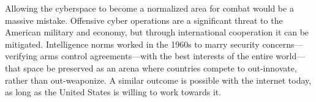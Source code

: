 \documentclass[11pt]{memoir}
\begin{document}
Allowing the cyberspace to become a normalized area for combat would be a massive mistake. Offensive cyber operations are a significant threat to the American military and economy, but through international cooperation it can be mitigated. Intelligence norms worked in the 1960s to marry security concerns---verifying arms control agreements---with the best interests of the entire world---that space be preserved as an arena where countries compete to out-innovate, rather than out-weaponize. A similar outcome is possible with the internet today, as long as the United States is willing to work towards it.









\end{document}
